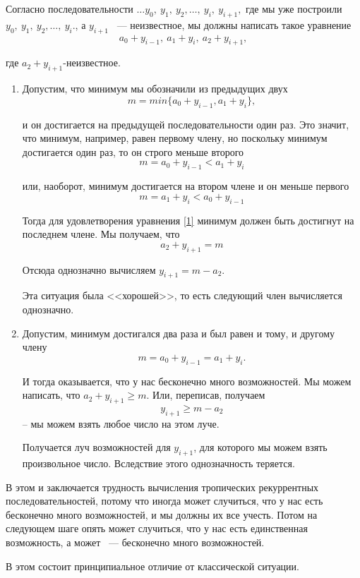 \documentclass[russian]{lecture-notes}
\begin{document}
Согласно последовательности $
 \ldots y_0,\:y_1,\:y_2,\ldots,\:y_i,\:y_{i+1},$
где мы уже построили $y_0,\:y_1,\:y_2,\ldots,\:y_i.$, а $y_{i+1}$ ~--- неизвестное, мы должны написать такое уравнение
\[
a_0+y_{i-1},\:a_1+y_i,\:a_2+y_{i+1},
\]
 

где $a_2+y_{i+1}$-неизвестное.
\vspace{\baselineskip}

\begin{enumerate}
 \item   Допустим, что минимум мы обозначили из предыдущих двух
$$m=min\{{a_0+y_{i-1},a_1+y_i}\},$$

и он достигается на предыдущей последовательности один раз. Это значит, что минимум, например, равен первому члену, но поскольку минимум достигается один раз, то он строго меньше второго
$$m=a_0+y_{i-1}<a_1+y_i$$

или, наоборот, минимум достигается на втором члене и он меньше первого
$$m=a_1+y_i<a_0+y_{i-1}$$

Тогда для удовлетворения уравнения \ref{1} минимум должен быть достигнут на последнем члене. Мы получаем, что
$$a_2+y_{i+1}=m$$

Отсюда однозначно вычисляем $y_{i+1}=m-a_2$.

Эта ситуация была <<хорошей>>, то есть следующий член вычисляется однозначно.
   
 \item  Допустим, минимум достигался два раза и был равен и тому, и другому члену
$$m=a_0+y_{i-1}=a_1+y_i.$$ 

И тогда оказывается, что у нас бесконечно много возможностей. Мы можем написать, что $a_2+y_{i+1}\geq m.$
Или, переписав, получаем
$$y_{i+1}\geq m-a_2$$
-- мы можем взять любое число на этом луче.

Получается луч возможностей для $y_{i+1}$, для которого мы можем взять произвольное число. Вследствие этого однозначность теряется.
\end{enumerate}

В этом и заключается трудность вычисления тропических рекуррентных последовательностей, потому что иногда может случиться, что у нас есть бесконечно много возможностей, и мы должны их все учесть. Потом на следующем шаге опять может случиться,  что у нас есть
единственная возможность, а может ~--- бесконечно много возможностей.

В этом состоит принципиальное отличие от классической ситуации.
\end{document}
